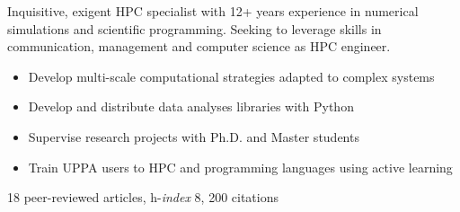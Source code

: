 \documentclass[10pt,a4paper,ragged2e,academicons]{altacv}
\begin{document}

\begin{fullwidth}
\makecvheader
\parbox{.7\paperwidth}{%
Inquisitive, exigent HPC specialist with 12+ years experience in numerical simulations and scientific programming. Seeking to leverage skills in communication, management and computer science as
HPC engineer.
}

\end{fullwidth}



\begin{itemize}
\item Develop multi-scale computational strategies adapted to complex systems
\item Develop and distribute data analyses libraries with Python
\item Supervise research projects with Ph.D. and Master students
\item Train UPPA users to HPC and programming languages using active learning
\end{itemize}
{\small 18 peer-reviewed articles, h-\textit{index} 8, 200 citations}
\end{document}
